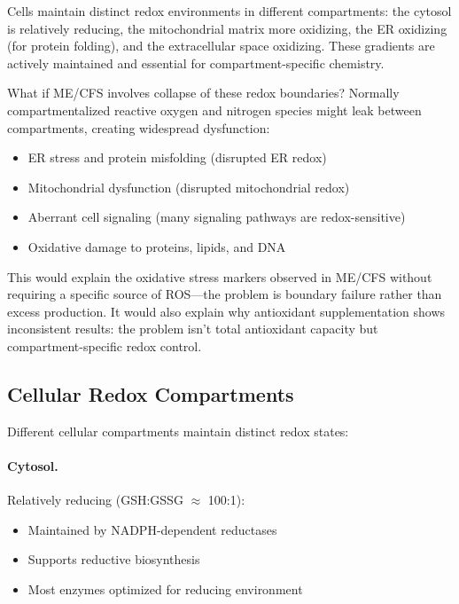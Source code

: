 \begin{open_question}
Cells maintain distinct redox environments in different compartments: the cytosol is relatively reducing, the mitochondrial matrix more oxidizing, the ER oxidizing (for protein folding), and the extracellular space oxidizing. These gradients are actively maintained and essential for compartment-specific chemistry.

What if ME/CFS involves collapse of these redox boundaries? Normally compartmentalized reactive oxygen and nitrogen species might leak between compartments, creating widespread dysfunction:
\begin{itemize}
    \item ER stress and protein misfolding (disrupted ER redox)
    \item Mitochondrial dysfunction (disrupted mitochondrial redox)
    \item Aberrant cell signaling (many signaling pathways are redox-sensitive)
    \item Oxidative damage to proteins, lipids, and DNA
\end{itemize}

This would explain the oxidative stress markers observed in ME/CFS without requiring a specific source of ROS---the problem is boundary failure rather than excess production. It would also explain why antioxidant supplementation shows inconsistent results: the problem isn't total antioxidant capacity but compartment-specific redox control.
\end{open_question}

\subsection{Cellular Redox Compartments}

Different cellular compartments maintain distinct redox states:

\paragraph{Cytosol.} Relatively reducing (GSH:GSSG $\approx$ 100:1):
\begin{itemize}
    \item Maintained by NADPH-dependent reductases
    \item Supports reductive biosynthesis
    \item Most enzymes optimized for reducing environment
\end{itemize}

